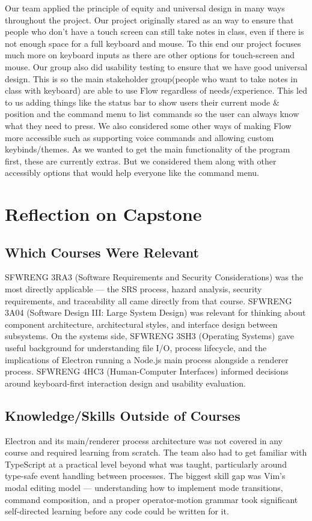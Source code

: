 \documentclass{article}
\begin{document}
Our team applied the principle of equity and universal design in many ways throughout 
the project. Our project originally stared as an way to ensure that people who don't have 
a touch screen can still take notes in class, even if there is not enough space for a full 
keyboard and mouse. To this end our project focuses much more on keyboard inputs as there 
are other options for touch-screen and mouse. Our group also did usability testing to 
ensure that we have good universal design. This is so the main stakeholder group(people 
who want to take notes in class with keyboard) are able to use Flow  regardless of 
needs/experience. This led to us adding things like the status bar to show users their 
current mode \& position and the command menu to list commands so the user can always know 
what they need to press. We also considered some other ways of making Flow more accessible 
such as supporting voice commands and allowing custom keybinds/themes. As we wanted to get 
the main functionality of the program first, these are currently extras. But we 
considered them along with other accessibly options that would help everyone like the 
command menu. 


\section{Reflection on Capstone}


\subsection{Which Courses Were Relevant}

SFWRENG 3RA3 (Software Requirements and Security Considerations) was the most directly applicable --- the SRS process, hazard analysis, security requirements, and traceability all came directly from that course. SFWRENG 3A04 (Software Design III: Large System Design) was relevant for thinking about component architecture, architectural styles, and interface design between subsystems. On the systems side, SFWRENG 3SH3 (Operating Systems) gave useful background for understanding file I/O, process lifecycle, and the implications of Electron running a Node.js main process alongside a renderer process. SFWRENG 4HC3 (Human-Computer Interfaces) informed decisions around keyboard-first interaction design and usability evaluation.

\subsection{Knowledge/Skills Outside of Courses}

Electron and its main/renderer process architecture was not covered in any course and required learning from scratch. The team also had to get familiar with TypeScript at a practical level beyond what was taught, particularly around type-safe event handling between processes. The biggest skill gap was Vim's modal editing model --- understanding how to implement mode transitions, command composition, and a proper operator-motion grammar took significant self-directed learning before any code could be written for it.
\end{document}
